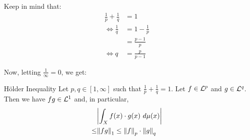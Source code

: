\begin{anmerkung}
	Keep in mind that:
	\begin{align*}
		\frac{1}{p} + \frac{1}{q} &= 1\\
		\Longleftrightarrow \frac{1}{q} &= 1 - \frac{1}{p}\\
		&= \frac{p-1}{p}\\
		\Longleftrightarrow q &= \frac{p}{p-1}
	\end{align*}
\end{anmerkung}

Now, letting $\frac{1}{\infty} = 0$, we get:
\begin{importantcorollary}{Hölder Inequality}{}
	Let $p,q \in [1,\infty]$ such that $\frac{1}{p} + \frac{1}{q} = 1$. Let $f \in \mathcal{L}^p$ and $g \in \mathcal{L}^q$. Then we have $fg \in \mathcal{L}^1$ and, in particular,
	\begin{align*}
		&\abs{\int_X f(x) \cdot g(x) ~d\mu(x)}\\
		\leq &\norm{fg}_1 \leq \norm{f}_p \cdot \norm{g}_q			
	\end{align*}
\end{importantcorollary}
